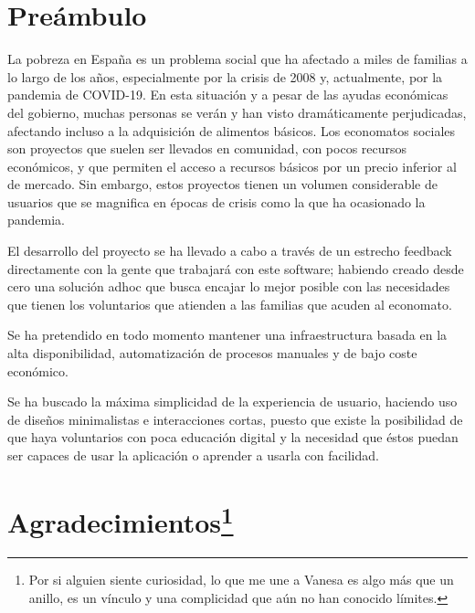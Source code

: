 
\chapter*{Preámbulo}
\thispagestyle{empty}
\par La pobreza en España es un problema social que ha afectado a miles de familias a lo largo de los años, especialmente por la crisis de 2008 y, actualmente, por la pandemia de COVID-19.
En esta situación y a pesar de las ayudas económicas del gobierno, muchas personas se verán y han visto dramáticamente perjudicadas, afectando incluso a la adquisición de alimentos básicos.
Los economatos sociales son proyectos que suelen ser llevados en comunidad, con pocos recursos económicos, y que permiten el acceso a recursos básicos por un precio inferior al de mercado. Sin embargo, estos proyectos tienen un volumen considerable de usuarios que se magnifica en épocas de crisis como la que ha ocasionado la pandemia.

\par El desarrollo del proyecto se ha llevado a cabo a través de un estrecho feedback directamente con la gente que trabajará con este software; habiendo creado desde cero una solución adhoc que busca encajar lo mejor posible con las necesidades que tienen los voluntarios que atienden a las familias que acuden al economato.
\par Se ha pretendido en todo momento mantener una infraestructura basada en la alta disponibilidad, automatización de procesos manuales y de bajo coste económico.
\par Se ha buscado la máxima simplicidad de la experiencia de usuario, haciendo uso de diseños minimalistas e interacciones cortas, puesto que existe la posibilidad de que haya voluntarios con poca educación digital y la necesidad que éstos puedan ser capaces de usar la aplicación o aprender a usarla con facilidad.

\cleardoublepage %
\chapter*{Agradecimientos\footnote{Por si alguien siente curiosidad, lo que me une a Vanesa es algo más que un anillo, es un vínculo y una complicidad que aún no han conocido límites.}
}

